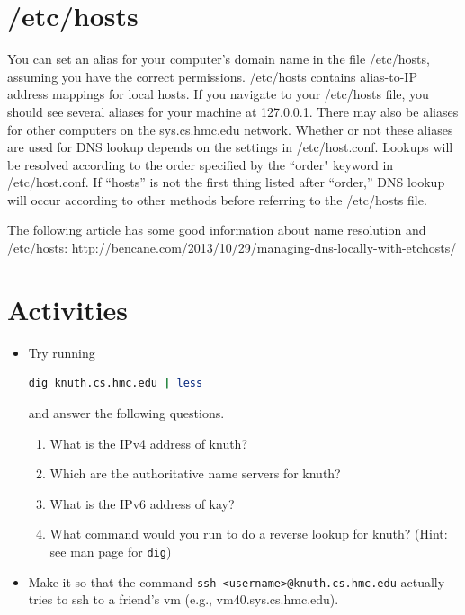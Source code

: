 \documentclass[11pt,a4paper]{article}
\begin{document}
\section{/etc/hosts}

You can set an alias for your computer's domain name in the file /etc/hosts, assuming you have the correct permissions. 
/etc/hosts contains alias-to-IP address mappings for local hosts.
If you navigate to your /etc/hosts file, you should see several aliases for your machine at 127.0.0.1.
There may also be aliases for other computers on the sys.cs.hmc.edu network.
Whether or not these aliases are used for DNS lookup depends on the settings in /etc/host.conf.
Lookups will be resolved according to the order specified by the ``order" keyword in /etc/host.conf. 
If ``hosts'' is not the first thing listed after ``order,'' DNS lookup will occur according to other methods before referring to the /etc/hosts file.

The following article has some good information about name resolution and /etc/hosts:
\url{http://bencane.com/2013/10/29/managing-dns-locally-with-etchosts/}

\section{Activities}

\begin{itemize}

\item Try running
\begin{lstlisting}[basicstyle=\ttfamily, backgroundcolor = \color{lightgray}, language = bash, xleftmargin = 0cm, framexleftmargin = 1em]
dig knuth.cs.hmc.edu | less
\end{lstlisting}
and answer the following questions.

\begin{enumerate}
\item What is the IPv4 address of knuth?
\item Which are the authoritative name servers for knuth?
\item What is the IPv6 address of kay?
\item What command would you run to do a reverse lookup for knuth? (Hint: see man page for \verb|dig|)
\end{enumerate}

\item Make it so that the command \texttt{ssh <username>@knuth.cs.hmc.edu} actually tries to ssh to a friend's vm (e.g., vm40.sys.cs.hmc.edu).
\end{itemize}
\end{document}
